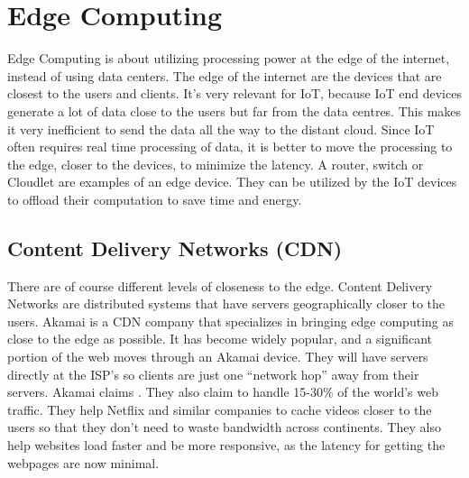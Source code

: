 \section{Edge Computing}
Edge Computing is about utilizing processing power at the edge of the internet, instead of using data centers. The edge of the internet are the devices that are closest to the users and clients. It's very relevant for IoT, because IoT end devices generate a lot of data close to the users but far from the data centres. This makes it very inefficient to send the data all the way to the distant cloud. Since IoT often requires real time processing of data, it is better to move the processing to the edge, closer to the devices, to minimize the latency\cite{shi_edge_2016}.
A router, switch or Cloudlet are examples of an edge device. They can be utilized by the IoT devices to offload their computation to save time and energy.

\subsection{Content Delivery Networks (CDN)}
There are of course different levels of closeness to the edge. Content Delivery Networks are distributed systems that have servers geographically closer to the users. Akamai is a CDN company that specializes in bringing edge computing as close to the edge as possible. It has become widely popular, and a significant portion of the web moves through an Akamai device. They will have servers directly at the ISP’s so clients are just one “network hop” away from their servers. Akamai\cite{noauthor_exceptional_nodate} claims . They also claim to handle 15-30\% of the world's web traffic. They help Netflix and similar companies to cache videos closer to the users so that they don't need to waste bandwidth across continents. They also help websites load faster and be more responsive, as the latency for getting the webpages are now minimal.





